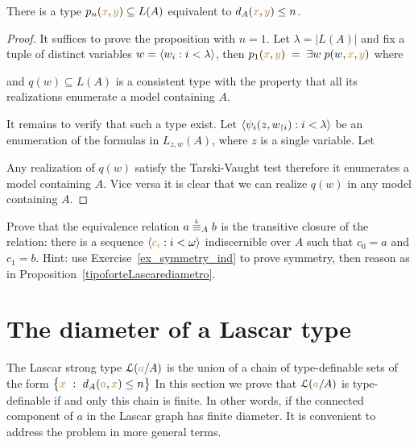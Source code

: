 \begin{proposition}\label{prop_Lascar_distance_type_def}
There is a type $p_n({\color{brown} x},{\color{brown} y})\subseteq L(A)$ equivalent to $d_A({\color{brown} x},{\color{brown} y})\le n$.  
\end{proposition}
\begin{proof}
It suffices to prove the proposition with $n=1$.
Let $\lambda=|L(A)|$ and fix a tuple of distinct variables $w=\langle w_i:i<\lambda\rangle$, then $p_1({\color{brown} x},{\color{brown} y})\;=\;\exists w\;p(w,{\color{brown} x},{\color{brown} y})$ where


and $q(w)\subseteq L(A)$ is a consistent type with the property that all its realizations enumerate a model containing $A$.

It remains to verify that such a type exist.
Let $\langle\psi_i(z,w_{\restriction i}):i<\lambda\rangle$ be an enumeration of the formulas in $L_{z,w}(A)$, where $z$ is a single variable.
Let 


Any realization of $q(w)$ satisfy the Tarski-Vaught test therefore it enumerates a model containing $A$.
Vice versa it is clear that we can realize $q(w)$ in any model containing $A$.
\end{proof}

\begin{exercise}\label{ex_Lstp_indiscernibles}
  Prove that the equivalence relation $a\stackrel{\smash{\scalebox{.5}{\rm L}}}{\equiv}_Ab$ is the transitive closure of the relation: there is a sequence $\langle{\color{brown}c_i}:i<\omega\rangle$ indiscernible over $A$ such that $c_0=a$ and $c_1=b$.
  Hint: use Exercise~\ref{ex_symmetry_ind} to prove symmetry, then reason as in Proposition~\ref{tipoforteLascarediametro}.
\end{exercise}

\section{The diameter of a Lascar type}\label{newelski}

The Lascar strong type $\EuScript L({\color{brown} a}/A)$ is the union of a chain of type-definable sets of the form $\big\{{\color{brown} x}\ :\ d_A({\color{brown} a},{\color{brown} x})\le n\big\}$
In this section we prove that $\EuScript L({\color{brown} a}/A)$ is type-definable if and only this chain is finite.
In other words, if the connected component of $a$ in the Lascar graph has finite diameter.
It is convenient to address the problem in more general terms.

